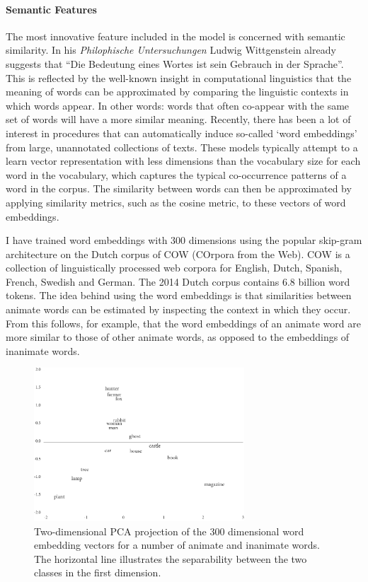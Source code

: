 \paragraph{Semantic Features}
The most innovative feature included in the model is concerned with semantic similarity. In his \textit{Philophische Untersuchungen} Ludwig Wittgenstein already suggests that ``Die Bedeutung eines Wortes ist sein Gebrauch in der Sprache''\autocite[`The meaning of a word is its use in the language.'][PU 43]{wittgenstein:1958}. This is reflected by the well-known insight in computational linguistics that the meaning of words can be approximated by comparing the linguistic contexts in which words appear. In other words: words that often co-appear with the same set of words will have a more similar meaning. Recently, there has been a lot of interest in procedures that can automatically induce so-called `word embeddings' from large, unannotated collections of texts\autocite[See for example][]{mikolov:2013,pennington:2014}. These models typically attempt to a learn vector representation with less dimensions than the vocabulary size for each word in the vocabulary, which captures the typical co-occurrence patterns of a word in the corpus. The similarity between words can then be approximated by applying similarity metrics, such as the cosine metric, to these vectors of word embeddings.

I have trained word embeddings with 300 dimensions using the popular skip-gram architecture\autocite{mikolov:2013} on the Dutch corpus of COW (COrpora from the Web). COW is a collection of linguistically processed web corpora for English, Dutch, Spanish, French, Swedish and German\autocite{schaefer:2012}. The 2014 Dutch corpus contains 6.8 billion word tokens. The idea behind using the word embeddings is that similarities between animate words can be estimated by inspecting the context in which they occur. From this follows, for example, that the word embeddings of an animate word are more similar to those of other animate words, as opposed to the embeddings of inanimate words.

\begin{figure}
\centering
\includegraphics[width=0.7\textwidth]{images/pca-clean.pdf}
\caption[PCA projection of animate and inanimate words.]{Two-dimensional PCA projection of the 300 dimensional word embedding vectors for a number of animate and inanimate words. The horizontal line illustrates the separability between the two classes in the first dimension.}
\label{fig:pca}
\end{figure}

